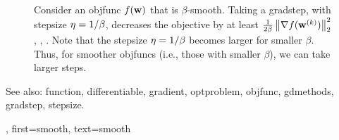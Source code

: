 {{\begin{figure}[H]
\begin{center}
	    	\end{center}
	    	\caption{Consider an \gls{objfunc} $f({\bf w})$ that is $\beta$-smooth. 
	    		Taking a \gls{gradstep}, with \gls{stepsize} $\eta = 1/\beta$, decreases the 
	    		objective by at least $\frac{1}{2\beta}\left\Vert {\nabla f({\bf w}^{(k)})} \right\Vert_{2}^{2}$ \cite{nesterov04}, \cite{CvxBubeck2015}, \cite{CvxAlgBertsekas}. 
	    		Note that the \gls{stepsize} $\eta = 1/\beta$ becomes larger for smaller $\beta$. Thus, 
	    		for smoother \glspl{objfunc} (i.e., those with smaller $\beta$), 
				we can take larger steps. \label{fig_gd_smooth_dict}}
	    	\end{figure}
		See also: \gls{function}, \gls{differentiable}, \gls{gradient}, \gls{optproblem}, \gls{objfunc}, \gls{gdmethods}, \gls{gradstep}, \gls{stepsize}.},
	first={smooth},
	text={smooth}
}

